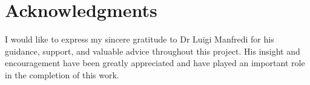 \chapter{Acknowledgments}
\thispagestyle{plain}

I would like to express my sincere gratitude to Dr Luigi Manfredi for his guidance, support, and valuable advice throughout this project. His insight and encouragement have been greatly appreciated and have played an important role in the completion of this work.